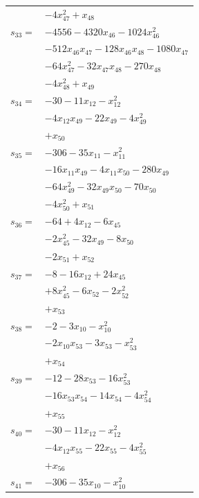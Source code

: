 \begin{longtable}{@{}r@{\;}l@{}}
 & \(\displaystyle -4x_{47}^{2} +x_{48}\) \\[3pt]
\(s_{33}=\) & \(\displaystyle -4556 -4320x_{46} -1024x_{46}^{2}\) \\
 & \(\displaystyle -512x_{46}x_{47} -128x_{46}x_{48} -1080x_{47}\) \\
 & \(\displaystyle -64x_{47}^{2} -32x_{47}x_{48} -270x_{48}\) \\
 & \(\displaystyle -4x_{48}^{2} +x_{49}\) \\[3pt]
\(s_{34}=\) & \(\displaystyle -30 -11x_{12} -x_{12}^{2}\) \\
 & \(\displaystyle -4x_{12}x_{49} -22x_{49} -4x_{49}^{2}\) \\
 & \(\displaystyle +x_{50}\) \\[3pt]
\(s_{35}=\) & \(\displaystyle -306 -35x_{11} -x_{11}^{2}\) \\
 & \(\displaystyle -16x_{11}x_{49} -4x_{11}x_{50} -280x_{49}\) \\
 & \(\displaystyle -64x_{49}^{2} -32x_{49}x_{50} -70x_{50}\) \\
 & \(\displaystyle -4x_{50}^{2} +x_{51}\) \\[3pt]
\(s_{36}=\) & \(\displaystyle -64 +4x_{12} -6x_{45}\) \\
 & \(\displaystyle -2x_{45}^{2} -32x_{49} -8x_{50}\) \\
 & \(\displaystyle -2x_{51} +x_{52}\) \\[3pt]
\(s_{37}=\) & \(\displaystyle -8 -16x_{12} +24x_{45}\) \\
 & \(\displaystyle +8x_{45}^{2} -6x_{52} -2x_{52}^{2}\) \\
 & \(\displaystyle +x_{53}\) \\[3pt]
\(s_{38}=\) & \(\displaystyle -2 -3x_{10} -x_{10}^{2}\) \\
 & \(\displaystyle -2x_{10}x_{53} -3x_{53} -x_{53}^{2}\) \\
 & \(\displaystyle +x_{54}\) \\[3pt]
\(s_{39}=\) & \(\displaystyle -12 -28x_{53} -16x_{53}^{2}\) \\
 & \(\displaystyle -16x_{53}x_{54} -14x_{54} -4x_{54}^{2}\) \\
 & \(\displaystyle +x_{55}\) \\[3pt]
\(s_{40}=\) & \(\displaystyle -30 -11x_{12} -x_{12}^{2}\) \\
 & \(\displaystyle -4x_{12}x_{55} -22x_{55} -4x_{55}^{2}\) \\
 & \(\displaystyle +x_{56}\) \\[3pt]
\(s_{41}=\) & \(\displaystyle -306 -35x_{10} -x_{10}^{2}\) \\

\end{longtable}
